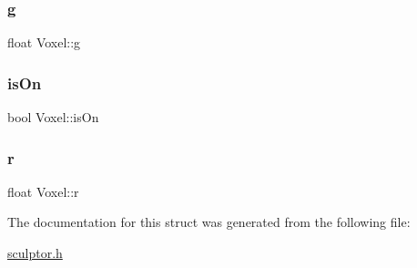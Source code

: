 \subsubsection{\texorpdfstring{g}{g}}
{\footnotesize\ttfamily float Voxel\+::g}

\mbox{\label{struct_voxel_a6fbe8bd53f64685ac4210726d40fc775}} 
\subsubsection{\texorpdfstring{isOn}{isOn}}
{\footnotesize\ttfamily bool Voxel\+::is\+On}

\mbox{\label{struct_voxel_a06872ec79b836120b551a848968c0f1b}} 
\subsubsection{\texorpdfstring{r}{r}}
{\footnotesize\ttfamily float Voxel\+::r}



The documentation for this struct was generated from the following file\+:\begin{DoxyCompactItemize}
\item 
\mbox{\hyperlink{sculptor_8h}{sculptor.\+h}}\end{DoxyCompactItemize}
